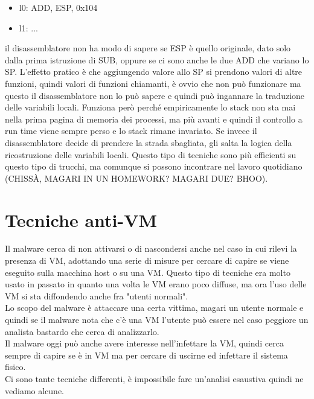 \documentclass[12pt, oneside]{extbook}
\begin{document}
\begin{itemize}
\item l0: ADD, ESP, 0x104
\item l1: ...
\end{itemize}
il disassemblatore non ha modo di sapere se ESP è quello originale, dato solo dalla prima istruzione di SUB, oppure se ci sono anche le due ADD che variano lo SP. L'effetto pratico è che aggiungendo valore allo SP si prendono valori di altre funzioni, quindi valori di funzioni chiamanti, è ovvio che non può funzionare ma questo il disassemblatore non lo può sapere e quindi può ingannare la traduzione delle variabili locali. Funziona però perché empiricamente lo stack non sta mai nella prima pagina di memoria dei processi, ma più avanti e quindi il controllo a run time viene sempre perso e lo stack rimane invariato. Se invece il disassemblatore decide di prendere la strada sbagliata, gli salta la logica della ricostruzione delle variabili locali. Questo tipo di tecniche sono più efficienti su questo tipo di trucchi, ma comunque si possono incontrare nel lavoro quotidiano (CHISSÀ, MAGARI IN UN HOMEWORK? MAGARI DUE? BHOO).
\section{Tecniche anti-VM}
Il malware cerca di non attivarsi o di nascondersi anche nel caso in cui rilevi la presenza di VM, adottando una serie di misure per cercare di capire se viene eseguito sulla macchina host o su una VM. Questo tipo di tecniche era molto usato in passato in quanto una volta le VM erano poco diffuse, ma ora l'uso delle VM si sta diffondendo anche fra "utenti normali".\\Lo scopo del malware è attaccare una certa vittima, magari un utente normale e quindi se il malware nota che c'è una VM l'utente può essere nel caso peggiore un analista bastardo che cerca di analizzarlo.\\Il malware oggi può anche avere interesse nell'infettare la VM, quindi cerca sempre di capire se è in VM ma per cercare di uscirne ed infettare il sistema fisico.\\Ci sono tante tecniche differenti, è impossibile fare un'analisi esaustiva quindi ne vediamo alcune.
\end{document}
